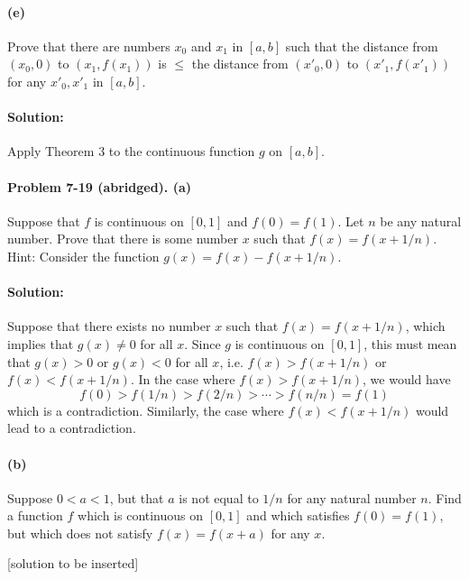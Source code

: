 \documentclass{article}
\begin{document}
\paragraph{(e)} Prove that there are numbers $x_0$ and $x_1$ in $[a, b]$ such
that the distance from $(x_0, 0)$ to $(x_1, f(x_1))$ is $\leq$ the distance
from $(x'_0, 0)$ to $(x'_1, f(x'_1))$ for any $x'_0, x'_1$ in $[a, b]$.

\paragraph{Solution:} Apply Theorem 3 to the continuous function $g$ on $[a,
b]$.

\paragraph{Problem 7-19 (abridged). (a)} Suppose that $f$ is continuous on $[0,
1]$ and $f(0) = f(1)$. Let $n$ be any natural number. Prove that there is some
number $x$ such that $f(x) = f(x + 1/n)$. Hint: Consider the function $g(x) =
f(x) - f(x + 1/n)$.

\paragraph{Solution:} Suppose that there exists no number $x$ such that $f(x) =
f(x + 1/n)$, which implies that $g(x) \neq 0$ for all $x$. Since $g$ is
continuous on $[0, 1]$, this must mean that $g(x) > 0$ or $g(x) < 0$ for all
$x$, i.e. $f(x) > f(x + 1/n)$ or $f(x) < f(x + 1/n)$. In the case where $f(x) >
f(x + 1/n)$, we would have \begin{equation*}
  f(0) > f(1/n) > f(2/n) > \cdots > f(n/n) = f(1)
\end{equation*} which is a contradiction. Similarly, the case where $f(x) < f(x
+ 1/n)$ would lead to a contradiction.

\paragraph{(b)} Suppose $0 < a < 1$, but that $a$ is not equal to $1/n$ for any
natural number $n$. Find a function $f$ which is continuous on $[0, 1]$ and
which satisfies $f(0) = f(1)$, but which does not satisfy $f(x) = f(x + a)$ for
any $x$.

[solution to be inserted]
\end{document}
